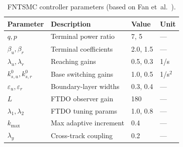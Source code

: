 \documentclass[review]{cas-dc}
\begin{document}
\begin{appendices}
\begin{table}[h]
\centering
\caption{FNTSMC controller parameters (based on Fan et~al.\ \citep{Fan2021}).}
\label{tab:fntsmc_params}
\begin{tabular}{llll}
\toprule
Parameter & Description & Value & Unit \\
\midrule
$q, p$ & Terminal power ratio & 7, 5 & --- \\
$\beta_u, \beta_r$ & Terminal coefficients & 2.0, 1.5 & --- \\
$\lambda_u, \lambda_r$ & Reaching gains & 0.5, 0.3 & 1/s \\
$k_{s,u}^0, k_{s,r}^0$ & Base switching gains & 1.0, 0.5 & 1/s$^2$ \\
$\varepsilon_u, \varepsilon_r$ & Boundary-layer widths & 0.3, 0.4 & --- \\
$L$ & FTDO observer gain & 180 & --- \\
$\lambda_1, \lambda_2$ & FTDO tuning params & 1.0, 0.8 & --- \\
$k_{\max}$ & Max adaptive increment & 0.4 & --- \\
$\lambda_y$ & Cross-track coupling & 0.2 & --- \\
\bottomrule
\end{tabular}
\end{table}

\end{appendices}
\end{document}

